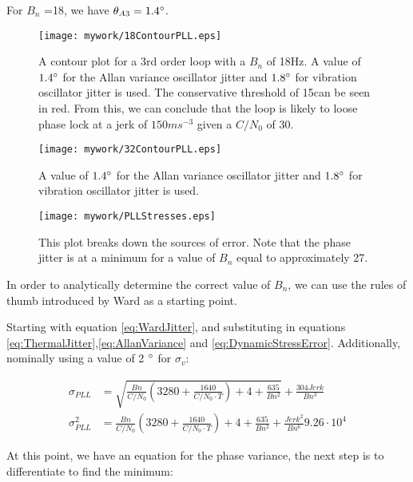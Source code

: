 For $B_n$ =18, we have $\theta_{A3}=1.4\degree$.


\begin{figure}[!htb] 
    \centering
    \texttt{[image: mywork/18ContourPLL.eps]} 
    \caption{A contour plot for a 3rd order loop with a $B_n$ of 18Hz. A value of $1.4\degree$ for the Allan variance oscillator jitter and $1.8\degree$ for vibration oscillator jitter is used. The conservative threshold of 15\degree can be seen in red. From this, we can conclude that the loop is likely to loose phase lock at a jerk of $150ms^{-3}$ given a $C/N_0$ of 30.}
    \label{fig:18HzPLLContourPlot}
\end{figure}

\begin{figure}[!htb] 
    \centering
    \texttt{[image: mywork/32ContourPLL.eps]} 
    \caption{A value of $1.4\degree$ for the Allan variance oscillator jitter and $1.8\degree$ for vibration oscillator jitter is used.}
\end{figure}


\begin{figure}[!htb] 
    \centering
    \texttt{[image: mywork/PLLStresses.eps]} 
    \caption{This plot breaks down the sources of error. Note that the phase jitter is at a minimum for a value of $B_n$ equal to approximately 27.}
\end{figure}

In order to analytically determine the correct value of $B_n$, we can use the rules of thumb introduced by Ward as a starting point\cite{Ward}.

Starting with equation \ref{eq:WardJitter}, and substituting in equations \ref{eq:ThermalJitter},\ref{eq:AllanVariance} and \ref{eq:DynamicStressError}.
Additionally, nominally using a value of 2 $\degree$ for $\sigma_v$:

\begin{align*}
\sigma_{PLL} &= \sqrt{\frac{Bn}{C/N_0} \left(3280 + \frac{1640}{C/N_0 \cdot T}\right) + 4 + \frac{635}{Bn^{2}}} + \frac{304 Jerk}{Bn^{3}}\\
\sigma_{PLL}^2 &= \frac{Bn}{C/N_0} \left(3280 + \frac{1640}{C/N_0 \cdot T}\right) + 4 + \frac{635}{Bn^{2}} + \frac{Jerk^{2}}{Bn^{6}} 9.26 \cdot 10^{4}
\end{align*}

At this point, we have an equation for the phase variance, the next step is to differentiate to find the minimum:

